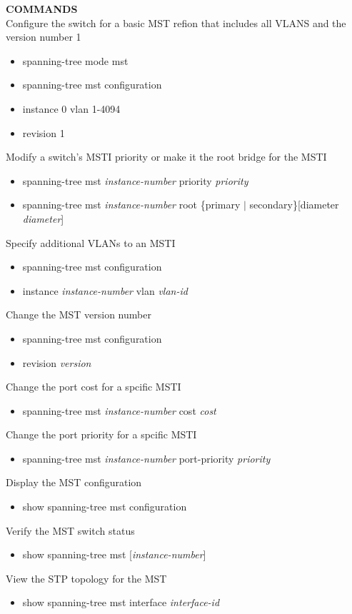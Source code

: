 \documentclass{article}
\begin{document}
\noindent\textbf{COMMANDS}\\
Configure the switch for a basic MST refion that includes all VLANS and the version number 1
\begin{itemize}
\item spanning-tree mode mst
\item spanning-tree mst configuration
\item instance 0 vlan 1-4094
\item revision 1
\end{itemize}
Modify a switch's MSTI priority or make it the root bridge for the MSTI
\begin{itemize}
\item spanning-tree mst \textit{instance-number} priority \textit{priority}
\item spanning-tree mst \textit{instance-number} root \{primary $|$ secondary\}[diameter \textit{diameter}]
\end{itemize}
Specify additional VLANs to an MSTI
\begin{itemize}
\item spanning-tree mst configuration
\item instance \textit{instance-number} vlan \textit{vlan-id}
\end{itemize}
Change the MST version number
\begin{itemize}
\item spanning-tree mst configuration
\item revision \textit{version}
\end{itemize}
Change the port cost for a spcific MSTI
\begin{itemize}
\item spanning-tree mst \textit{instance-number} cost \textit{cost}
\end{itemize}
Change the port priority for a spcific MSTI
\begin{itemize}
\item spanning-tree mst \textit{instance-number} port-priority \textit{priority}
\end{itemize}
Display the MST configuration
\begin{itemize}
\item show spanning-tree mst configuration
\end{itemize}
Verify the MST switch status
\begin{itemize}
\item show spanning-tree mst [\textit{instance-number}]
\end{itemize}
View the STP topology for the MST
\begin{itemize}
\item show spanning-tree mst interface \textit{interface-id}
\end{itemize}
\end{document}
